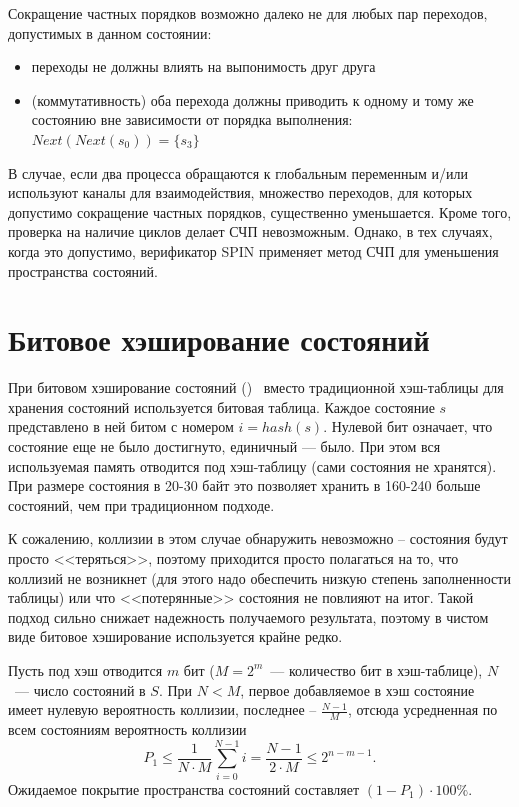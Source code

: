 Сокращение частных порядков возможно далеко не для любых пар переходов, допустимых в
данном состоянии:

\begin{itemize}
\item переходы не должны влиять на выпонимость друг друга
\item (коммутативность) оба перехода должны приводить к одному и тому же состоянию
  вне зависимости от порядка выполнения: $Next(Next(s_0)) = \{ s_3 \}$
\end{itemize}

В случае, если два процесса обращаются к глобальным переменным и/или
используют каналы для взаимодействия, множество переходов, для которых
допустимо сокращение частных порядков, существенно уменьшается. Кроме
того, проверка на наличие циклов делает СЧП невозможным. Однако, в тех
случаях, когда это допустимо, верификатор SPIN применяет метод СЧП для
уменьшения пространства состояний.


\section{Битовое хэширование состояний}
\label{sec:bit-hashing}

При битовом хэширование состояний ()~\cite{BitHash1} вместо
традиционной хэш-таблицы для хранения состояний используется битовая таблица. Каждое
состояние $s$ представлено в ней битом с номером $i = hash(s)$. Нулевой бит
означает, что состояние еще не было достигнуто, единичный — было. При этом вся
используемая память отводится под хэш-таблицу (сами состояния не хранятся). При размере
состояния в 20-30 байт это позволяет хранить в 160-240 больше состояний, чем при
традиционном подходе.

К сожалению, коллизии в этом случае обнаружить невозможно -- состояния будут просто
<<теряться>>, поэтому приходится просто полагаться на то, что коллизий не возникнет (для
этого надо обеспечить низкую степень заполненности таблицы) или что <<потерянные>>
состояния не повлияют на итог. Такой подход сильно снижает надежность получаемого
результата, поэтому в чистом виде битовое хэширование используется крайне редко.

Пусть под хэш отводится $m$ бит ($M = 2^m$~--- количество бит в хэш-таблице), $N$~---
число состояний в $S$. При $N < M$, первое добавляемое в хэш состояние имеет нулевую
вероятность коллизии, последнее -- $\frac{N - 1}{M}$, отсюда усредненная по всем
состояниям вероятность коллизии
\begin{equation}
  \label{eq:bithash-single-coll1}
  P_1 \leq \frac{1}{N\cdot M} \sum_{i=0}^{N-1}i = \frac{N - 1}{2\cdot M} \leq 2^{n - m - 1}.
\end{equation}
Ожидаемое покрытие пространства состояний составляет $(1 - P_1)\cdot 100\%$.

